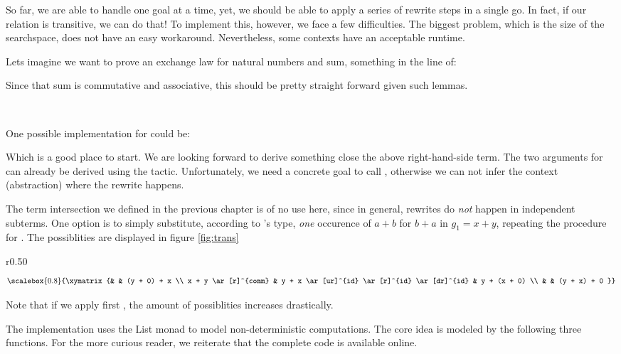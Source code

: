 So far, we are able to handle one goal at a time, yet, we should be able to
apply a series of rewrite steps in a single go. In fact, if our relation
is transitive, we can do that! To implement this, however, we face a few
difficulties. The biggest problem, which is the size of the searchspace,
does not have an easy workaround. Nevertheless, some contexts have an acceptable runtime. 

Lets imagine we want to prove an exchange law for natural numbers and sum, something
in the line of:


Since that sum is commutative and associative, this should be pretty straight forward
given such lemmas.

\\

One possible implementation for  could be:


Which is a good place to start. We are looking forward to derive something close the above
right-hand-side term. The two arguments for  can already be derived using the 
tactic. Unfortunately, we need a concrete goal to call , otherwise we can not infer the
context (abstraction) where the rewrite happens.

The term intersection we defined in the previous chapter is of no use here, since in general,
rewrites do \emph{not} happen in independent subterms. One option is to simply substitute, according
to 's type, \emph{one} occurence of $a + b$ for $b + a$ in $g_1 = x + y$, repeating
the procedure for . The possiblities are displayed in figure \ref{fig:trans}

\begin{wrapfigure}{r}{0.50\textwidth}
\begin{displaymath}
\scalebox{0.8}{%
\xymatrix{%
  & & (y + 0) + x \\
x + y \ar[r]^{comm} & y + x \ar[ur]^{id} \ar[r]^{id} \ar[dr]^{id} & y + (x + 0) \\
& & (y + x) + 0
}}
\end{displaymath}
\caption{Substitution outcomes}
\label{fig:trans}
\end{wrapfigure}

Note that if we apply first , the amount of possiblities increases drastically.

The implementation uses the List monad to model non-deterministic computations. The core idea
is modeled by the following three functions. For the more curious reader, we reiterate that
the complete code is available online.

